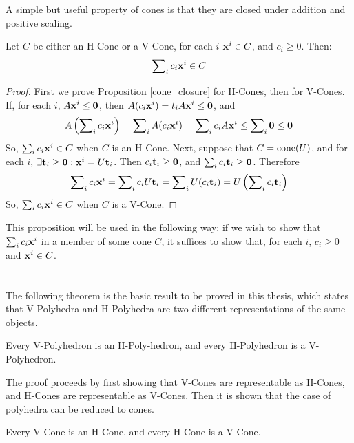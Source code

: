 A simple but useful property of cones is that they are closed under addition and positive scaling.

\begin{Prop}\label{cone_closure}
	Let $C$ be either an H-Cone or a V-Cone, for each $i$ $\mathbf{x}^i \in C$, and $c_i \geq 0$.  Then:
	\[ \sum\nolimits_i c_i \mathbf{x}^i \in C \]
\end{Prop}

\begin{proof}
	First we prove Proposition \ref{cone_closure} for H-Cones, then for V-Cones.
	If, for each $i$, $A\mathbf{x}^i \leq \mathbf{0}$, then $A(c_i\mathbf{x}^i) = t_iA\mathbf{x}^i \leq \mathbf{0}$, and
	\[ A\left(\sum\nolimits_i c_i\mathbf{x}^i\right) = \sum\nolimits_i A (c_i\mathbf{x}^i) =
		\sum\nolimits_i c_i A\mathbf{x}^i \leq \sum\nolimits_i \mathbf{0} \leq \mathbf{0} \]
	So, $\sum\nolimits_i c_i\mathbf{x}^i \in C$ when $C$ is an H-Cone.  Next, suppose that $C = \operatorname{cone}(U)$, and for each $i$, $\exists \mathbf{t}_i \geq \mathbf{0}: \mathbf{x}^i = U\mathbf{t}_i$.  Then $c_i\mathbf{t}_i \geq \mathbf{0}$, and $\sum\nolimits_i c_i\mathbf{t}_i \geq \mathbf{0}$.  Therefore
	\[ \sum\nolimits_i c_i\mathbf{x}^i = \sum\nolimits_i c_i U\mathbf{t}_i = \sum\nolimits_i U(c_i\mathbf{t}_i)
		= U\left(\sum\nolimits_i c_i\mathbf{t}_i\right) \]
	So, $\sum\nolimits_i c_i\mathbf{x}^i \in C$ when $C$ is a V-Cone.
\end{proof}

This proposition will be used in the following way: if we wish to show that $\sum\nolimits_i c_i\mathbf{x}^i$ in a member of some cone $C$, it suffices to show that, for each $i$, $c_i \geq 0$ and $\mathbf{x}^i \in C$.


\section{\MWT}

The following theorem is the basic result to be proved in this thesis, which states that V-Polyhedra and H-Polyhedra are two different representations of the same objects.

\begin{Thm}[{\MWT}]
		Every V-Polyhedron is an H-Poly-hedron, and every H-Polyhedron is a V-Polyhedron.
\end{Thm}

The proof proceeds by first showing that V-Cones are representable as H-Cones, and H-Cones are representable as V-Cones.  Then it is shown that the case of polyhedra can be reduced to cones.

\begin{Thm}
		Every V-Cone is an H-Cone, and every H-Cone is a V-Cone.
\end{Thm}

